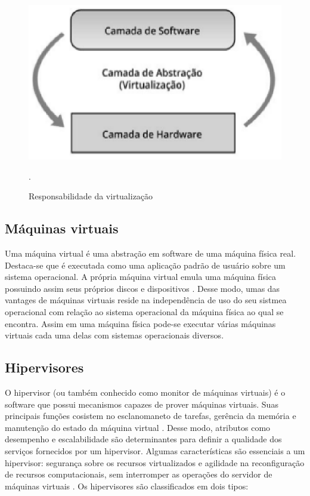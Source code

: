 \begin{figure}[!htb]
\centering
\includegraphics [keepaspectratio=true,scale=0.60]{figuras/virtualization_role.eps}
\caption{Responsabilidade da virtualização}
\cite{manoel}.
\label{virtualization_role}
\end{figure}

\subsection{Máquinas virtuais}
Uma máquina virtual é uma abstração em software de uma máquina física real. Destaca-se que é executada como uma aplicação padrão de usuário sobre um sistema operacional. A própria máquina virtual emula uma máquina física possuindo assim seus próprios discos e dispositivos \cite{}. Desse modo, umas das vantages de máquinas virtuais reside na independência de uso do seu sistmea operacional com relação ao sistema operacional da máquina física ao qual se encontra. Assim em uma máquina física pode-se executar várias máquinas virtuais cada uma delas com sistemas operacionais diversos. 
\subsection{Hipervisores}
O hipervisor (ou também conhecido como monitor de máquinas virtuais) é o software que possui mecanismos capazes de prover máquinas virtuais. Suas principais funções cosistem no esclanomaneto de tarefas, gerência da memória e manutenção do estado da máquina virtual \cite{manoel}. Desse modo, atributos como desempenho e escalabilidade são determinantes para definir a qualidade dos serviços fornecidos por um hipervisor. Algumas características são essenciais a um hipervisor: segurança sobre os recursos virtualizados e agilidade na reconfiguração de recursos computacionais, sem interromper as operações do servidor de máquinas virtuais \cite{manoel}. Os hipervisores são classificados em dois tipos:

